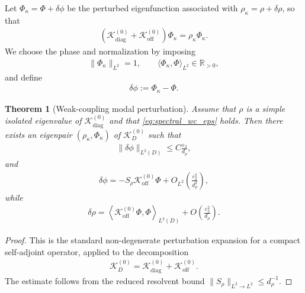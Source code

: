 \documentclass[10pt]{article}
\numberwithin{equation}{section}
\newtheorem{theorem}{Theorem}[section]
\begin{document}
Let $\Phi_\kappa=\Phi+\delta\phi$ be the perturbed eigenfunction associated with $\rho_\kappa=\rho+\delta\rho$, so that
\begin{align*}
    (\mathcal{K}_{\mathrm{diag}}^{(0)}+\mathcal{K}_{\mathrm{off}}^{(0)})\Phi_\kappa
    =
    \rho_\kappa\Phi_\kappa.
\end{align*}
We choose the phase and normalization by imposing
\begin{align*}
    \|\Phi_\kappa\|_{L^2}=1,
    \qquad
    \langle \Phi_\kappa,\Phi\rangle_{L^2}\in\mathbb R_{>0},
\end{align*}
and define
\begin{align*}
    \delta\phi:=\Phi_\kappa-\Phi.
\end{align*}



\begin{theorem}[Weak-coupling modal perturbation]
\label{thm:3D_modal_expansion}
Assume that $\rho$ is a simple isolated eigenvalue of $\mathcal K_{\mathrm{diag}}^{(0)}$ and that \eqref{eq:spectral_wc_eps} holds. Then there exists an eigenpair $(\rho_\kappa,\Phi_\kappa)$ of $\mathcal K_D^{(0)}$
such that
\begin{align}
    \|\delta\phi\|_{L^2(D)}
    \leq
    C\frac{\varepsilon_2}{d_\rho},
    \label{eq:L2_modal_perturbation}
\end{align}
and
\begin{align}
    \delta\phi
    =
    -S_\rho\mathcal K_{\mathrm{off}}^{(0)}\Phi
    +
    O_{L^2}
    \left(
        \frac{\varepsilon_2^2}{d_\rho^2}
    \right),
    \label{eq:first_order_modal_perturbation}
\end{align}
while
\begin{align}
    \delta\rho
    =
    \left\langle
    \mathcal K_{\mathrm{off}}^{(0)}\Phi,\Phi
    \right\rangle_{L^2(D)}
    +
    O\left(\frac{\varepsilon_2^2}{d_\rho}\right).
    \label{eq:eigenvalue_shift}
\end{align}
\end{theorem}

\begin{proof}
This is the standard non-degenerate perturbation expansion for a compact self-adjoint operator, applied to the decomposition
\begin{align*}
    \mathcal K_D^{(0)}
    =
    \mathcal K_{\mathrm{diag}}^{(0)}
    +
    \mathcal K_{\mathrm{off}}^{(0)}.
\end{align*}
The estimate follows from the reduced resolvent bound
\(\|S_\rho\|_{L^2\to L^2}\leq d_\rho^{-1}\).
\end{proof}
\end{document}
